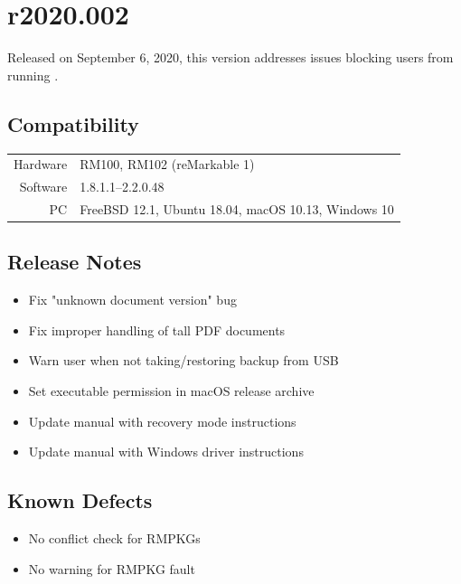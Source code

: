 \documentclass{memoir}
\begin{document}
{{%
\newpage
\section{r2020.002}
\label{sec:r2020-002}
Released on September 6, 2020, this version addresses issues blocking users from running .

\subsection{Compatibility}
\begin{tabular}{ r | l }
  Hardware & RM100, RM102 (reMarkable 1) \\
  Software & 1.8.1.1--2.2.0.48 \\
  PC & FreeBSD 12.1, Ubuntu 18.04, macOS 10.13, Windows 10 \\
\end{tabular}

\subsection{Release Notes}
\begin{itemize}
\item{Fix "unknown document version" bug}
\item{Fix improper handling of tall PDF documents}
\item{Warn user when not taking/restoring backup from USB}
\item{Set executable permission in macOS release archive}
\item{Update manual with recovery mode instructions}
\item{Update manual with Windows driver instructions}
\end{itemize}

\subsection{Known Defects}
\begin{itemize}
\item{No conflict check for RMPKGs}
\item{No warning for RMPKG fault}
\end{itemize}









\newpage
}}
\end{document}
